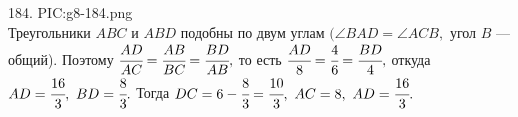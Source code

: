 184. {{PIC:g8-184.png}}\\
Треугольники $ABC$ и $ABD$ подобны по двум углам $(\angle BAD = \angle ACB,$ угол $B$ --- общий). Поэтому $\cfrac{AD}{AC}=\cfrac{AB}{BC}=\cfrac{BD}{AB},$ то есть
$\cfrac{AD}{8}=\cfrac{4}{6}=\cfrac{BD}{4},$ откуда $AD=\cfrac{16}{3},\ BD=\cfrac{8}{3}.$ Тогда $DC=6-\cfrac{8}{3}=\cfrac{10}{3},\ AC=8,\ AD=\cfrac{16}{3}.$\\
